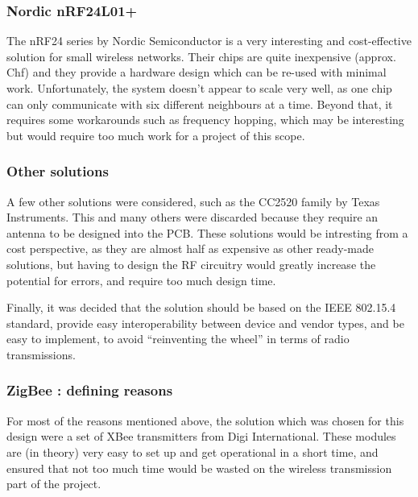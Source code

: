 \subsubsection{Nordic nRF24L01+}

The nRF24 series by Nordic Semiconductor is a
very interesting and cost-effective solution for small wireless networks. Their
chips are quite inexpensive (approx. \unit[7]{Chf}) and they provide a hardware
design which can be re-used with minimal work. Unfortunately, the system doesn't
appear to scale very well, as one chip can only communicate with six different
neighbours at a time. Beyond that, it requires some workarounds such as
frequency hopping, which may be interesting but would require too much work for
a project of this scope.

\subsubsection{Other solutions}

A few other solutions were considered, such as the CC2520 family by Texas
Instruments. This and many others were discarded because
they require an antenna to be designed into the PCB. These solutions would be
intresting from a cost perspective, as they are almost half as expensive as
other ready-made solutions, but having to design the RF circuitry would greatly
increase the potential for errors, and require too much design time. 

Finally, it was decided that the solution should be based on the IEEE 802.15.4
standard, provide easy interoperability between device and vendor types, and be
easy to implement, to avoid ``reinventing the wheel'' in terms of radio
transmissions.

\subsubsection{ZigBee : defining reasons}
\label{sub:zigbee}

For most of the reasons mentioned above, the solution which was chosen for this
design were a set of XBee transmitters from Digi
International. These modules are (in theory) very easy to
set up and get operational in a short time, and ensured that not too much time
would be wasted on the wireless transmission part of the project.

